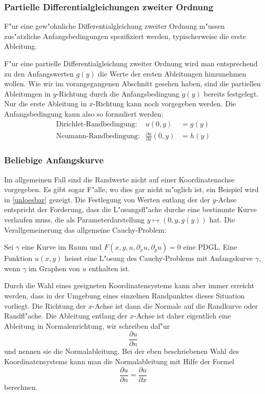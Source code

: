 \subsubsection{Partielle Differentialgleichungen zweiter Ordnung}
F"ur eine gew"ohnliche Differentialgleichung zweiter Ordnung m"ussen
zus"atzliche Anfangsbedingungen spezifiziert werden, typischerweise
die erste Ableitung.

F"ur eine partielle Differentialgleichung zweiter
Ordnung wird man entsprechend zu den Anfangswerten $g(y)$ die Werte
der ersten Ableitungen hinzunehmen wollen.
Wie wir im vorangegangenen Abschnitt gesehen haben, sind die partiellen
Ableitungen in $y$-Richtung durch die Anfangsbedingung $g(y)$ bereits
festgelegt. Nur die erste Ableitung in $x$-Richtung kann noch
vorgegeben werden. Die Anfangsbedingung kann also so formuliert
werden:
\begin{align}
&\text{Dirichlet-Randbedingung:}&
u(0,y)&=g(y)&
\label{klassifikation:dirichlet-randbedingung}
\\
&\text{Neumann-Randbedingung:}&
\frac{\partial u}{\partial x}(0,y)&=h(y)
\label{klassifikation:neumann-randbedingung}
\end{align}

\subsubsection{Beliebige Anfangskurve}
Im allgemeinen Fall sind die Randwerte nicht auf einer Koordinatenachse
vorgegeben. Es gibt sogar F"alle, wo dies gar nicht m"oglich ist,
ein Beispiel wird in \ref{unloesbar} gezeigt.
Die Festlegung von Werten entlang der der $y$-Achse entspricht
der Forderung, dass die L"osungsfl"ache durche eine bestimmte Kurve
verlaufen muss, die als Parameterdarstellung $y\mapsto (0,y,g(y))$
hat. Die Verallgemeinerung das allgemeine Cauchy-Problem:

\begin{problem} Sei $\gamma$ eine Kurve im Raum und
$F(x,y,u,\partial_xu,\partial_yu)=0$ eine PDGL. Eine Funktion $u(x,y)$
heisst eine L"osung des Cauchy-Problems mit Anfangskurve $\gamma$, wenn
$\gamma$ im Graphen von $u$ enthalten ist.
\end{problem}

Durch die Wahl eines geeigneten Koordinatensystems kann aber immer
erreicht werden, dass in der Umgebung eines einzelnen Randpunktes
dieses Situation vorliegt.
Die Richtung der $x$-Achse ist dann die Normale auf die Randkurve oder
Randfl"ache.
Die Ableitung entlang der $x$-Achse ist daher eigentlich eine Ableitung
in Normalenrichtung, wir schreiben daf"ur
\[
\frac{\partial u}{\partial n}
\]
und nennen sie die Normalableitung.
Bei der eben beschriebenen Wahl des Koordinatensystems kann man
die Normalableitung mit Hilfe der Formel
\[
\frac{\partial u}{\partial n}
=\frac{\partial u}{\partial x}
\]
berechnen.


